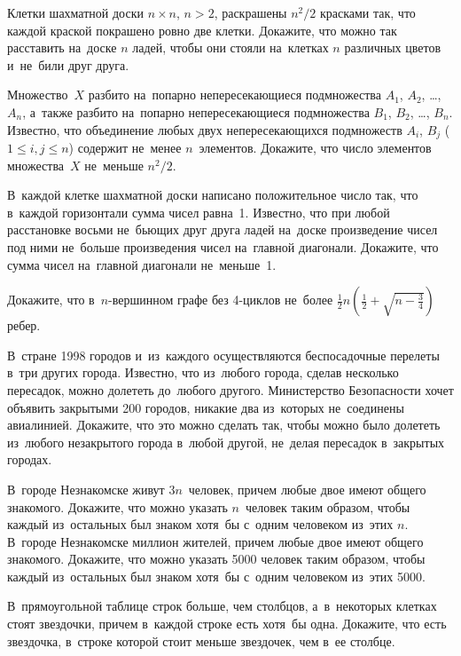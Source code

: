 


\begin{problems}

\item
Клетки шахматной доски $n \times n$, $n > 2$, раскрашены $n^2 / 2$ красками
так, что каждой краской покрашено ровно две клетки.
Докажите, что можно так расставить на~доске $n$ ладей, чтобы они стояли
на~клетках $n$ различных цветов и~не~били друг друга.

\item
Множество~$X$ разбито на~попарно непересекающиеся подмножества
$A_{1}$, $A_{2}$, \ldots, $A_{n}$, а~также разбито на~попарно непересекающиеся
подмножества $B_{1}$, $B_{2}$, \ldots, $B_{n}$.
Известно, что объединение любых двух непересекающихся подмножеств
$A_{i}$, $B_{j}$ ($1 \leq i, j \leq n$) содержит не~менее $n$~элементов.
Докажите, что число элементов множества~$X$ не~меньше $n^2/2$.

\item
В~каждой клетке шахматной доски написано положительное число так, что в~каждой
горизонтали сумма чисел равна~1.
Известно, что при любой расстановке восьми не~бьющих друг друга ладей на~доске
произведение чисел под ними не~больше произведения чисел на~главной диагонали.
Докажите, что сумма чисел на~главной диагонали не~меньше~1.

\item
Докажите, что в~$n$-вершинном графе без 4-циклов не~более
$\frac{1}{2} n \left( \frac{1}{2} + \sqrt{n - \frac{3}{4}} \right)$
ребер.

\item
В~стране 1998 городов и~из~каждого осуществляются беспосадочные перелеты в~три
других города.
Известно, что из~любого города, сделав несколько пересадок, можно долететь
до~любого другого.
Министерство Безопасности хочет объявить закрытыми 200 городов, никакие два
из~которых не~соединены авиалинией.
Докажите, что это можно сделать так, чтобы можно было долететь из~любого
незакрытого города в~любой другой, не~делая пересадок в~закрытых городах.

\item
\subproblem
В~городе Незнакомске живут $3n$~человек, причем любые двое имеют общего
знакомого.
Докажите, что можно указать $n$~человек таким образом, чтобы каждый
из~остальных был знаком хотя~бы с~одним человеком из~этих $n$.
\\
\subproblem
В~городе Незнакомске миллион жителей, причем любые двое имеют общего знакомого.
Докажите, что можно указать 5000 человек таким образом, чтобы каждый
из~остальных был знаком хотя~бы с~одним человеком из~этих 5000.

\item
В~прямоугольной таблице строк больше, чем столбцов, а~в~некоторых клетках стоят
звездочки, причем в~каждой строке есть хотя~бы одна.
Докажите, что есть звездочка, в~строке которой стоит меньше звездочек, чем в~ее
столбце.

\end{problems}

